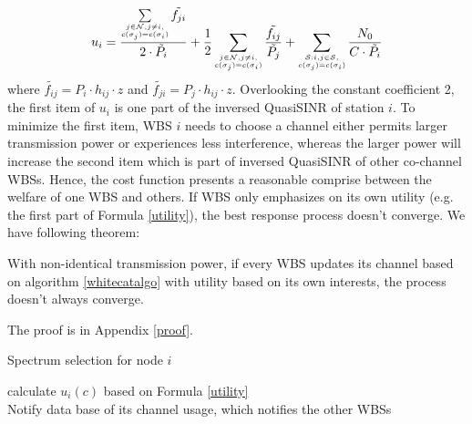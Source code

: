 \begin{equation}
\label{utility}
u_i =\dfrac{\sum\limits_{\tiny\substack{j\in \mathcal{N}, j\ne i,\\ c(\sigma_j)=c(\sigma_i)}}\tilde{f_{ji}}}{2\cdot \tilde{P_i}} + \dfrac{1}{2}\sum_{\tiny\substack{j\in \mathcal{N}, j\ne i,\\ c(\sigma_j)=c(\sigma_i)}}\dfrac{\tilde{f_{ij}}}{\tilde{P_j}} + \sum_{\tiny\substack{\mathcal{S}:i,j\in \mathcal{S},\\ c(\sigma_j)=c(\sigma_i)}}\dfrac{N_0}{C\cdot \tilde{P_i}}\\
\end{equation}
where $\tilde{f_{ij}}= P_i\cdot h_{ij}\cdot z$ and $\tilde{f_{ji}}= P_j\cdot h_{ij}\cdot z$.
Overlooking the constant coefficient 2, the first item of $u_i$ is one part of the inversed QuasiSINR of station $i$. To minimize the first item, WBS $i$ needs to choose a channel either permits larger transmission power or experiences less interference, whereas the larger power will increase the second item which is part of inversed QuasiSINR of other co-channel WBSs. Hence, the cost function presents a reasonable comprise between the welfare of one WBS and others. If WBS only emphasizes on its own utility (e.g. the first part of Formula \ref{utility}), the best response process doesn't converge. We have following theorem:
\begin{theorem}
\label{noconvergence}
With non-identical transmission power, if every WBS updates its channel based on algorithm \ref{whitecatalgo} with utility based on its own interests, the process doesn't always converge.
\end{theorem}
The proof is in Appendix \ref{proof}.


\begin{algorithm}[!h]
\caption{Spectrum selection for node $i$}          %
\label{whitecatalgo} 
{
{
 calculate $u_i(c)$ based on Formula \ref{utility}\\
}
Notify data base of its channel usage, which notifies the other WBSs
}
\end{algorithm}

